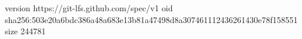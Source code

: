 version https://git-lfs.github.com/spec/v1
oid sha256:503e20a6bdc386a48a683e13b81a47498d8a307461112436261430e78f158551
size 244781
